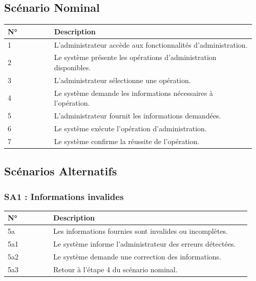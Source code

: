 \hypertarget{scuxe9nario-nominal-6}{%
\subsection{Scénario Nominal}\label{scuxe9nario-nominal-6}}

\begin{longtable}{@{}p{0.18\linewidth}p{0.78\linewidth}@{}}
\toprule
\rowcolors{2}{gray!10}{white}
\textbf{N°} & \textbf{Description} \\
\midrule
\endhead
1 & L'administrateur accède aux fonctionnalités d'administration. \\
2 & Le système présente les opérations d'administration disponibles. \\
3 & L'administrateur sélectionne une opération. \\
4 & Le système demande les informations nécessaires à l'opération. \\
5 & L'administrateur fournit les informations demandées. \\
6 & Le système exécute l'opération d'administration. \\
7 & Le système confirme la réussite de l'opération. \\
\bottomrule
\end{longtable}

\hypertarget{scuxe9narios-alternatifs-6}{%
\subsection{Scénarios Alternatifs}\label{scuxe9narios-alternatifs-6}}

\hypertarget{sa1-informations-invalides-1}{%
\subsubsection{SA1 : Informations
invalides}\label{sa1-informations-invalides-1}}

\begin{longtable}{@{}p{0.18\linewidth}p{0.78\linewidth}@{}}
\toprule
\rowcolors{2}{gray!10}{white}
\textbf{N°} & \textbf{Description} \\
\midrule
\endhead
5a & Les informations fournies sont invalides ou incomplètes. \\
5a1 & Le système informe l'administrateur des erreurs détectées. \\
5a2 & Le système demande une correction des informations. \\
5a3 & Retour à l'étape 4 du scénario nominal. \\
\bottomrule
\end{longtable}

